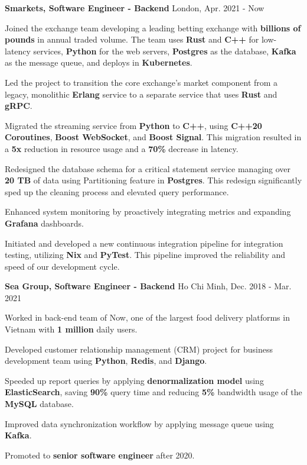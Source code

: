 \begin{cventries} %
  \cvsimpleentry
  {\textbf{Smarkets, Software Engineer - Backend}} %
  {London, Apr. 2021 - Now} %
  {
    \begin{cvitems} %
      \item {Joined the exchange team developing a leading betting exchange with \textbf{billions of pounds} in annual traded volume. The team uses \textbf{Rust} and \textbf{C++} for low-latency services, \textbf{Python} for the web servers, \textbf{Postgres} as the database, \textbf{Kafka} as the message queue, and deploys in \textbf{Kubernetes}.}
      \item {Led the project to transition the core exchange's market component from a legacy, monolithic \textbf{Erlang} service to a separate service that uses \textbf{Rust} and \textbf{gRPC}.}
      \item {Migrated the streaming service from \textbf{Python} to \textbf{C++}, using \textbf{C++20 Coroutines}, \textbf{Boost WebSocket}, and \textbf{Boost Signal}. This migration resulted in a \textbf{5x} reduction in resource usage and a \textbf{70\%} decrease in latency.}
      \item {Redesigned the database schema for a critical statement service managing over \textbf{20 TB} of data using Partitioning feature in \textbf{Postgres}. This redesign significantly sped up the cleaning process and elevated query performance.}
      \item {Enhanced system monitoring by proactively integrating metrics and expanding \textbf{Grafana} dashboards.}
      \item {Initiated and developed a new continuous integration pipeline for integration testing, utilizing \textbf{Nix} and \textbf{PyTest}. This pipeline improved the reliability and speed of our development cycle.}
    \end{cvitems}
  }

  \cvsimpleentry
    {\textbf{Sea Group, Software Engineer - Backend}} %
    {Ho Chi Minh, Dec. 2018 - Mar. 2021} %
    {
      \begin{cvitems} %
        \item {Worked in back-end team of Now, one of the largest food delivery platforms in Vietnam with \textbf{1 million} daily users.}
        \item {Developed customer relationship management (CRM) project for business development team using \textbf{Python}, \textbf{Redis}, and \textbf{Django}.}
        \item {Speeded up report queries by applying \textbf{denormalization model} using \textbf{ElasticSearch}, saving \textbf{90\%} query time and reducing \textbf{5\%} bandwidth usage of the \textbf{MySQL} database.}
        \item {Improved data synchronization workflow by applying message queue using \textbf{Kafka}.}
        \item {Promoted to \textbf{senior software engineer} after 2020.}
      \end{cvitems}
    }


\end{cventries}
